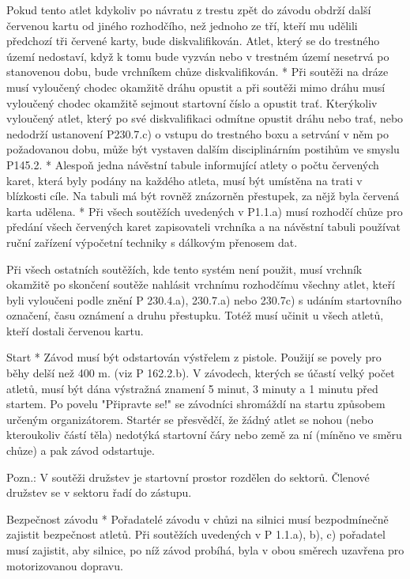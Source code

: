   Pokud tento atlet kdykoliv po návratu z trestu zpět do závodu obdrží další červenou kartu od jiného rozhodčího, než jednoho ze tří, kteří mu udělili předchozí tři červené karty, bude diskvalifikován. Atlet, který se do trestného území nedostaví, když k tomu bude vyzván nebo v trestném území nesetrvá po stanovenou dobu, bude vrchníkem chůze diskvalifikován.
  * Při soutěži na dráze musí vyloučený chodec okamžitě dráhu opustit a při soutěži mimo dráhu musí vyloučený chodec okamžitě sejmout startovní číslo a opustit trať. Kterýkoliv vyloučený atlet, který po své diskvalifikaci odmítne opustit dráhu nebo trať, nebo nedodrží ustanovení P230.7.c) o vstupu do trestného boxu a setrvání v něm po požadovanou dobu, může být vystaven dalším disciplinárním postihům ve smyslu P145.2.
  * Alespoň jedna návěstní tabule informující atlety o počtu červených karet, která byly podány na každého atleta, musí být umístěna na trati v blízkosti cíle. Na tabuli má být rovněž znázorněn přestupek, za nějž byla červená karta udělena.
  * Při všech soutěžích uvedených v P1.1.a) musí rozhodčí chůze pro předání všech červených karet zapisovateli vrchníka a na návěstní tabuli používat ruční zařízení výpočetní techniky s dálkovým přenosem dat.

  Při všech ostatních soutěžích, kde tento systém není použit, musí vrchník okamžitě po skončení soutěže nahlásit vrchnímu rozhodčímu všechny atlet, kteří byli vyloučeni podle znění P 230.4.a), 230.7.a) nebo 230.7c) s udáním startovního označení, času oznámení a druhu přestupku. Totéž musí učinit u všech atletů, kteří dostali červenou kartu.
  \enditems

Start
* Závod musí být odstartován výstřelem z pistole. Použijí se povely pro běhy delší než 400 m. (viz P 162.2.b). V závodech, kterých se účastí velký počet atletů, musí být dána výstražná znamení 5 minut, 3 minuty a 1 minutu před startem.  Po povelu "Připravte se!" se závodníci shromáždí na startu způsobem určeným organizátorem. Startér se přesvědčí, že žádný atlet se nohou (nebo kteroukoliv částí těla) nedotýká startovní čáry nebo země za ní (míněno ve směru chůze) a pak závod odstartuje.

Pozn.: V soutěži družstev je startovní prostor rozdělen do sektorů. Členové družstev se v sektoru řadí do zástupu.

Bezpečnost závodu
* Pořadatelé závodu v chůzi na silnici musí bezpodmínečně zajistit bezpečnost atletů. Při soutěžích uvedených v P 1.1.a), b), c) pořadatel musí zajistit, aby silnice, po níž závod probíhá, byla v obou směrech uzavřena pro motorizovanou dopravu.

